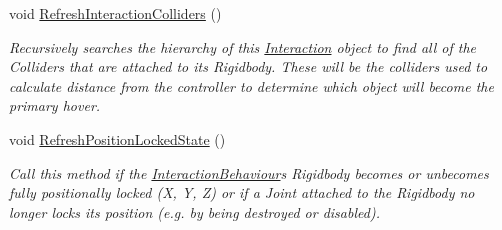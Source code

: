 \begin{DoxyCompactItemize}
\item 
void \mbox{\hyperlink{class_leap_1_1_unity_1_1_interaction_1_1_interaction_behaviour_a523c4be606d88a5323fb925a04b08c47}{Refresh\+Interaction\+Colliders}} ()
\begin{DoxyCompactList}\small\item\em Recursively searches the hierarchy of this \mbox{\hyperlink{namespace_leap_1_1_unity_1_1_interaction}{Interaction}} object to find all of the Colliders that are attached to its Rigidbody. These will be the colliders used to calculate distance from the controller to determine which object will become the primary hover. \end{DoxyCompactList}\item 
void \mbox{\hyperlink{class_leap_1_1_unity_1_1_interaction_1_1_interaction_behaviour_a33f9f48f2c6375cb926cc94ea2cb6f24}{Refresh\+Position\+Locked\+State}} ()
\begin{DoxyCompactList}\small\item\em Call this method if the \mbox{\hyperlink{class_leap_1_1_unity_1_1_interaction_1_1_interaction_behaviour}{Interaction\+Behaviour}}\textquotesingle{}s Rigidbody becomes or unbecomes fully positionally locked (X, Y, Z) or if a Joint attached to the Rigidbody no longer locks its position (e.\+g. by being destroyed or disabled). \end{DoxyCompactList}\end{DoxyCompactItemize}
